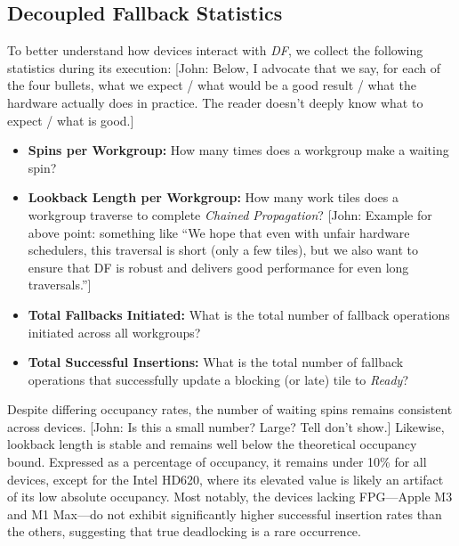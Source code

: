 \documentclass[acmsmall, manuscript, screen, review, anonymous]{acmart}
\newcommand{\john}[1]{{\footnotesize\color{cyan}[John: #1]}}
\begin{document}
\subsection{Decoupled Fallback Statistics}
To better understand how devices interact with \emph{DF}, we collect the following statistics during its execution: \john{Below, I advocate that we say, for each of the four bullets, what we expect / what would be a good result / what the hardware actually does in practice. The reader doesn't deeply know what to expect / what is good.}
\begin{itemize}
  \item \textbf{Spins per Workgroup:} How many times does a workgroup make a waiting spin?
  \item \textbf{Lookback Length per Workgroup:} How many work tiles does a workgroup traverse to complete \emph{Chained Propagation}? \john{Example for above point: something like ``We hope that even with unfair hardware schedulers, this traversal is short (only a few tiles), but we also want to ensure that DF is robust and delivers good performance for even long traversals.''}
  \item \textbf{Total Fallbacks Initiated:} What is the total number of fallback operations initiated across all workgroups?
  \item \textbf{Total Successful Insertions:} What is the total number of fallback operations that successfully update a blocking (or late) tile to \emph{Ready}?
\end{itemize}
Despite differing occupancy rates, the number of waiting spins remains consistent across devices. \john{Is this a small number? Large? Tell don't show.} Likewise, lookback length is stable and remains well below the theoretical occupancy bound. Expressed as a percentage of occupancy, it remains under 10\% for all devices, except for the Intel HD620, where its elevated value is likely an artifact of its low absolute occupancy. Most notably, the devices lacking FPG---Apple M3 and M1 Max---do not exhibit significantly higher successful insertion rates than the others, suggesting that true deadlocking is a rare occurrence.
\end{document}

